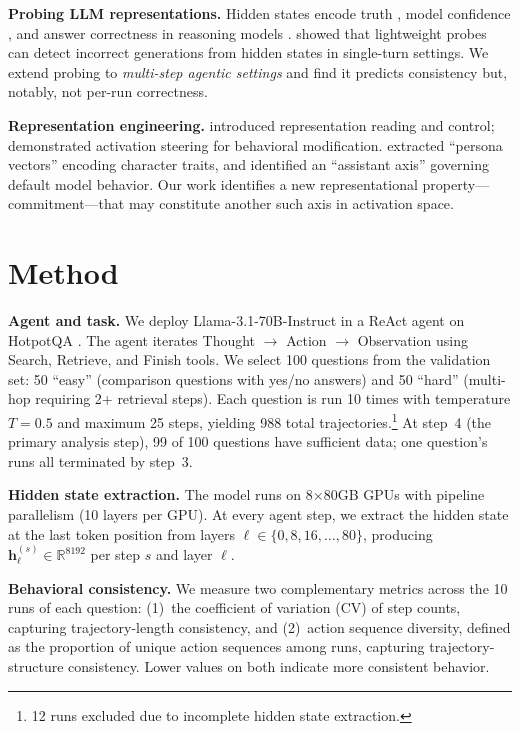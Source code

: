\documentclass{article}
\begin{document}
\textbf{Probing LLM representations.} Hidden states encode truth \citep{burns2023discovering, marks2024geometry}, model confidence \citep{kadavath2022language}, and answer correctness in reasoning models \citep{stickland2024reasoning}. \citet{gnosis} showed that lightweight probes can detect incorrect generations from hidden states in single-turn settings. We extend probing to \emph{multi-step agentic settings} and find it predicts consistency but, notably, not per-run correctness.

\textbf{Representation engineering.} \citet{zou2023repe} introduced representation reading and control; \citet{turner2023steering} demonstrated activation steering for behavioral modification. \citet{anthropic_persona} extracted ``persona vectors'' encoding character traits, and \citet{anthropic_axis} identified an ``assistant axis'' governing default model behavior. Our work identifies a new representational property---commitment---that may constitute another such axis in activation space.

\section{Method}

\textbf{Agent and task.} We deploy Llama-3.1-70B-Instruct \citep{llama3} in a ReAct \citep{react} agent on HotpotQA \citep{hotpotqa}. The agent iterates Thought $\rightarrow$ Action $\rightarrow$ Observation using Search, Retrieve, and Finish tools. We select 100 questions from the validation set: 50 ``easy'' (comparison questions with yes/no answers) and 50 ``hard'' (multi-hop requiring 2+ retrieval steps). Each question is run 10 times with temperature $T{=}0.5$ and maximum 25 steps, yielding 988 total trajectories.\footnote{12 runs excluded due to incomplete hidden state extraction.} At step~4 (the primary analysis step), 99 of 100 questions have sufficient data; one question's runs all terminated by step~3.

\textbf{Hidden state extraction.} The model runs on 8$\times$80GB GPUs with pipeline parallelism (10 layers per GPU). At every agent step, we extract the hidden state at the last token position from layers $\ell \in \{0, 8, 16, \ldots, 80\}$, producing $\mathbf{h}_{\ell}^{(s)} \in \mathbb{R}^{8192}$ per step $s$ and layer $\ell$.

\textbf{Behavioral consistency.} We measure two complementary metrics across the 10 runs of each question: (1)~the coefficient of variation (CV) of step counts, capturing trajectory-length consistency, and (2)~action sequence diversity, defined as the proportion of unique action sequences among runs, capturing trajectory-structure consistency. Lower values on both indicate more consistent behavior.
\end{document}
